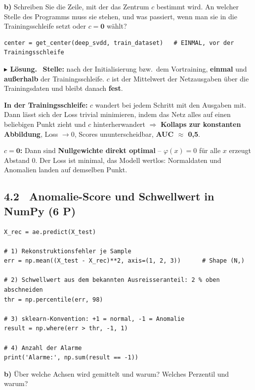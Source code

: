 \documentclass[10pt,a4paper]{article}
\newcommand{\pkt}[1]{\hfill\textbf{(#1 P)}}
\newenvironment{loes}%
  {\par\vspace{2pt}\begingroup\small\noindent\textbf{\color{loesfarbe}$\blacktriangleright$ Lösung.}\ }%
  {\endgroup\par\vspace{5pt}}
\begin{document}
\textbf{b)} Schreiben Sie die Zeile, mit der das Zentrum $c$ bestimmt wird. An welcher Stelle des
Programms muss sie stehen, und was passiert, wenn man sie in die Trainingsschleife setzt oder
$c = \mathbf{0}$ wählt?

\begin{lstlisting}
center = get_center(deep_svdd, train_dataset)   # EINMAL, vor der Trainingsschleife
\end{lstlisting}

\begin{loes}
\textbf{Stelle:} nach der Initialisierung bzw.\ dem Vortraining, \textbf{einmal} und
\textbf{außerhalb} der Trainingsschleife. $c$ ist der Mittelwert der Netzausgaben über die
Trainingsdaten und bleibt danach \textbf{fest}.

\textbf{In der Trainingsschleife:} $c$ wandert bei jedem Schritt mit den Ausgaben mit. Dann lässt
sich der Loss trivial minimieren, indem das Netz alles auf einen beliebigen Punkt zieht und $c$
hinterherwandert $\Rightarrow$ \textbf{Kollaps zur konstanten Abbildung}, Loss $\to 0$,
Scores ununterscheidbar, \textbf{AUC $\approx$ 0,5}.

\textbf{$c = \mathbf{0}$:} Dann sind \textbf{Nullgewichte direkt optimal} -- $\varphi(x) = 0$ für
alle $x$ erzeugt Abstand 0. Der Loss ist minimal, das Modell wertlos: Normaldaten und Anomalien
landen auf demselben Punkt.
\end{loes}

\newpage
\subsection*{4.2 \ Anomalie-Score und Schwellwert in NumPy \pkt{6}}

\begin{lstlisting}
X_rec = ae.predict(X_test)

# 1) Rekonstruktionsfehler je Sample
err = np.mean((X_test - X_rec)**2, axis=(1, 2, 3))      # Shape (N,)

# 2) Schwellwert aus dem bekannten Ausreisseranteil: 2 % oben abschneiden
thr = np.percentile(err, 98)

# 3) sklearn-Konvention: +1 = normal, -1 = Anomalie
result = np.where(err > thr, -1, 1)

# 4) Anzahl der Alarme
print('Alarme:', np.sum(result == -1))
\end{lstlisting}

\textbf{b)} Über welche Achsen wird gemittelt und warum? Welches Perzentil und warum?
\end{document}
